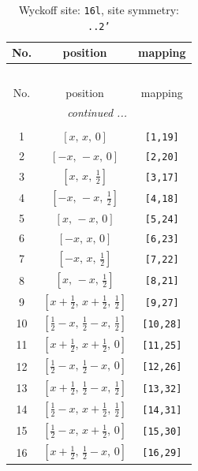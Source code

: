 \documentclass[fleqn,8pt]{jsarticle}
\begin{document}
\renewcommand{\arraystretch}{1.2}
\begin{longtable}{ccc}
\caption{Wyckoff site: {\tt 16l}, site symmetry: {\tt ..2'}}
 \\
 \hline \hline
No. & position & mapping \\ \hline \endfirsthead

\multicolumn{2}{l}{\tablename\ \thetable{}} \\
 \hline \hline
No. & position & mapping \\ \hline \endhead

 \hline \hline
\multicolumn{2}{r}{\footnotesize\it continued ...} \\ \endfoot

 \hline \hline
\multicolumn{2}{r}{} \\ \endlastfoot

1 & $\left[ x,\, x,\, 0 \right]$ & {\tt [1,19]} \\ \hline
2 & $\left[ - x,\, - x,\, 0 \right]$ & {\tt [2,20]} \\ \hline
3 & $\left[ x,\, x,\, \frac{1}{2} \right]$ & {\tt [3,17]} \\ \hline
4 & $\left[ - x,\, - x,\, \frac{1}{2} \right]$ & {\tt [4,18]} \\ \hline
5 & $\left[ x,\, - x,\, 0 \right]$ & {\tt [5,24]} \\ \hline
6 & $\left[ - x,\, x,\, 0 \right]$ & {\tt [6,23]} \\ \hline
7 & $\left[ - x,\, x,\, \frac{1}{2} \right]$ & {\tt [7,22]} \\ \hline
8 & $\left[ x,\, - x,\, \frac{1}{2} \right]$ & {\tt [8,21]} \\ \hline
9 & $\left[ x + \frac{1}{2},\, x + \frac{1}{2},\, \frac{1}{2} \right]$ & {\tt [9,27]} \\ \hline
10 & $\left[ \frac{1}{2} - x,\, \frac{1}{2} - x,\, \frac{1}{2} \right]$ & {\tt [10,28]} \\ \hline
11 & $\left[ x + \frac{1}{2},\, x + \frac{1}{2},\, 0 \right]$ & {\tt [11,25]} \\ \hline
12 & $\left[ \frac{1}{2} - x,\, \frac{1}{2} - x,\, 0 \right]$ & {\tt [12,26]} \\ \hline
13 & $\left[ x + \frac{1}{2},\, \frac{1}{2} - x,\, \frac{1}{2} \right]$ & {\tt [13,32]} \\ \hline
14 & $\left[ \frac{1}{2} - x,\, x + \frac{1}{2},\, \frac{1}{2} \right]$ & {\tt [14,31]} \\ \hline
15 & $\left[ \frac{1}{2} - x,\, x + \frac{1}{2},\, 0 \right]$ & {\tt [15,30]} \\ \hline
16 & $\left[ x + \frac{1}{2},\, \frac{1}{2} - x,\, 0 \right]$ & {\tt [16,29]} \\
\end{longtable}
\end{document}
